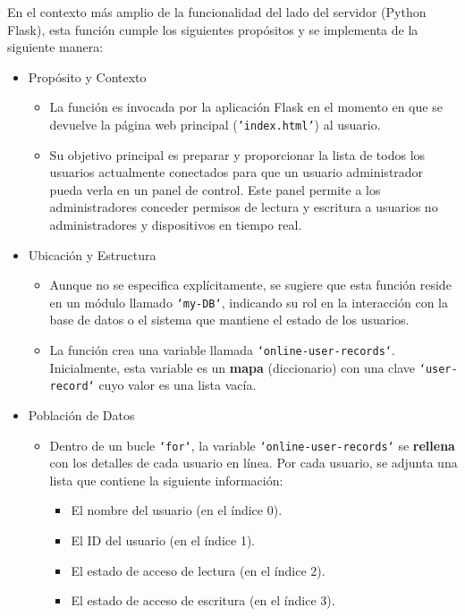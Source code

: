 \documentclass{report}
\begin{document}
En el contexto más amplio de la funcionalidad del lado del servidor (Python Flask), esta función cumple los siguientes propósitos y se implementa de la 
siguiente manera:
\begin{itemize}
    \item Propósito y Contexto
        \begin{itemize}
            \item La función es invocada por la aplicación Flask en el momento en que se devuelve la página web principal (\texttt{'index.html'}) al usuario.
            \item Su objetivo principal es preparar y proporcionar la lista de todos los usuarios actualmente conectados para que un usuario administrador 
            pueda verla en un panel de control. Este panel permite a los administradores conceder permisos de lectura y escritura a usuarios no administradores 
            y dispositivos en tiempo real.
        \end{itemize}

    \item Ubicación y Estructura
        \begin{itemize}
            \item Aunque no se especifica explícitamente, se sugiere que esta función reside en un módulo llamado \texttt{`my-DB`}, indicando su rol 
            en la interacción con la base de datos o el sistema que mantiene el estado de los usuarios.
            \item La función crea una variable llamada \texttt{`online-user-records`}. Inicialmente, esta variable es un \textbf{mapa} (diccionario) con 
            una clave \texttt{`user-record`} cuyo valor es una lista vacía.
        \end{itemize}

    \item Población de Datos
        \begin{itemize}
            \item Dentro de un bucle \texttt{`for`}, la variable \texttt{`online-user-records`} se \textbf{rellena} con los detalles de cada usuario 
            en línea. Por cada usuario, se adjunta una lista que contiene la siguiente información:
                \begin{itemize}
                    \item El nombre del usuario  (en el índice 0).
                    \item El ID del usuario  (en el índice 1).
                    \item El estado de acceso de lectura (en el índice 2).
                    \item El estado de acceso de escritura (en el índice 3).
                \end{itemize} 
        \end{itemize}


\end{itemize}
\end{document}
